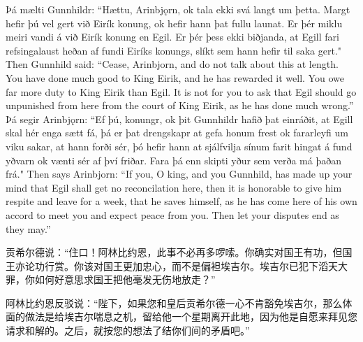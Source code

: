 \begin{paracol}{2}
    Þá mælti Gunnhildr: ``Hættu, Arinbjǫrn, ok tala ekki svá langt um þetta. Margt hefir þú vel gert við Eirík konung, ok hefir hann þat fullu launat. Er þér miklu meiri vandi á við Eirík konung en Egil. Er þér þess ekki biðjanda, at Egill fari refsingalaust heðan af fundi Eiríks konungs, slíkt sem hann hefir til saka gert."
    \switchcolumn
    Then Gunnhild said: ``Cease, Arinbjorn, and do not talk about this at length. You have done much good to King Eirik, and he has rewarded it well. You owe far more duty to King Eirik than Egil. It is not for you to ask that Egil should go unpunished from here from the court of King Eirik, as he has done much wrong.''
    \switchcolumn*
    Þá segir Arinbjǫrn: ``Ef þú, konungr, ok þit Gunnhildr hafið þat einráðit, at Egill skal hér enga sætt fá, þá er þat drengskapr at gefa honum frest ok fararleyfi um viku sakar, at hann forði sér, þó hefir hann at sjálfvilja sínum farit hingat á fund yðvarn ok vænti sér af því friðar. Fara þá enn skipti yður sem verða má þaðan frá."
    \switchcolumn
    Then says Arinbjorn: ``If you, O king, and you Gunnhild, has made up your mind that Egil shall get no reconcilation here, then it is honorable to give him respite and leave for a week, that he saves himself, as he has come here of his own accord to meet you and expect peace from you. Then let your disputes end as they may.''
\end{paracol}
\begin{translation*}{}
    贡希尔德说：“住口！阿林比约恩，此事不必再多啰嗦。你确实对国王有功，但国王亦论功行赏。你该对国王更加忠心，而不是偏袒埃吉尔。埃吉尔已犯下滔天大罪，你如何好意思求国王把他毫发无伤地放走？”

    阿林比约恩反驳说：“陛下，如果您和皇后贡希尔德一心不肯豁免埃吉尔，那么体面的做法是给埃吉尔喘息之机，留给他一个星期离开此地，因为他是自愿来拜见您请求和解的。之后，就按您的想法了结你们间的矛盾吧。”
\end{translation*}
